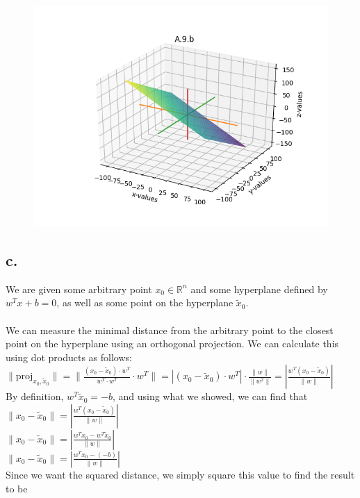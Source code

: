 \documentclass{article}
\newcommand{\field}[1]{\mathbb{#1}}
\newcommand{\1}{\mathbf{1}}
\newcommand{\R}{\field{R}} %
\begin{document}
{\begin{figure}[ht!]
  \centering
  \includegraphics[width=180mm]{A9b.PNG}
\end{figure}

\subsection*{c.}
We are given some arbitrary point $x_0 \in \R^n$ and some hyperplane defined by $w^Tx + b = 0$, as well as some point on the hyperplane $ \widetilde{x}_0$. \\ \\
We can measure the minimal distance from the arbitrary point to the closest point on the hyperplane using an orthogonal projection. We can calculate this using dot products as follows: \\
$\| \text{proj}_{x_0, \widetilde{x}_0} \| = \| \frac{(x_0 - \widetilde{x}_0) \cdot w^T}{w^T \cdot w^T} \cdot w^T \| = |(x_0 - \widetilde{x}_0) \cdot w^T| \cdot \frac{\| w \|}{\| w^2 \|}  = | \frac{w^T(x_0 - \widetilde{x}_0)}{\| w \|} |$ \\
By definition, $w^T \widetilde{x}_0 = -b$, and using what we showed, we can find that \\ 
$\| x_0 - \widetilde{x}_0 \| = | \frac{w^T(x_0 - \widetilde{x}_0)}{\|w\|} |$ \\
$\| x_0 - \widetilde{x}_0 \| = | \frac{w^Tx_0 - w^T\widetilde{x}_0}{\|w\|} |$ \\
$\| x_0 - \widetilde{x}_0 \| = | \frac{w^Tx_0 - (-b)}{\|w\|} |$ \\
Since we want the squared distance, we simply square this value to find the result to be  \\

}
\end{document}
